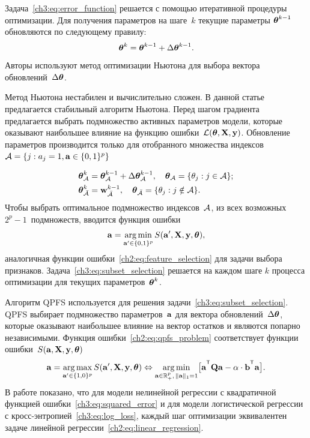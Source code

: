 Задача~\eqref{ch3:eq:error_function} решается с помощью итеративной процедуры оптимизации. 
Для получения параметров на шаге~$k$ текущие параметры $\boldsymbol{\theta}^{k-1}$ обновляются по следующему правилу:
\begin{equation}
\boldsymbol{\theta}^k = \boldsymbol{\theta}^{k - 1} + \Delta \boldsymbol{\theta}^{k - 1}.
\label{ch3:eq:update_rule}
\end{equation}
Авторы используют метод оптимизации Ньютона для выбора вектора обновлений~$\Delta \boldsymbol{\theta}$.

Метод Ньютона нестабилен и вычислительно сложен. 
В данной статье предлагается стабильный алгоритм Ньютона. 
Перед шагом градиента предлагается выбрать подмножество активных параметров модели, которые оказывают наибольшее влияние на функцию ошибки~$\mathcal{L} (\boldsymbol{\theta}, \mathbf{X}, \mathbf{y})$.
Обновление параметров производится только для отобранного множества индексов~$\mathcal{A} = \{j: a_j = 1, \mathbf{a} \in \{0, 1\}^p\}$

\begin{align*}
\boldsymbol{\theta}_{\mathcal{A}}^k &= \boldsymbol{\theta}_{\mathcal{A}}^{k - 1} + \Delta \boldsymbol{\theta}_{\mathcal{A}}^{k - 1}, \quad \boldsymbol{\theta}_{\mathcal{A}} = \{\theta_j: j \in \mathcal{A} \}; \\
\boldsymbol{\theta}_{\bar{\mathcal{A}}}^k &= \mathbf{w}_{\bar{\mathcal{A}}}^{k - 1}, \quad \boldsymbol{\theta}_{\bar{\mathcal{A}}} = \{\theta_j: j \notin \mathcal{A} \}.
\end{align*}
Чтобы выбрать оптимальное подмножество индексов~$\mathcal{A}$, из всех возможных $2^p - 1$~подмножеств, вводится функция ошибки
\begin{equation}
\mathbf{a} = \mathop{\arg \min}\limits_{\mathbf{a}' \in \{0, 1\}^p} S(\mathbf{a}', \mathbf{X}, \mathbf{y}, \boldsymbol{\theta}),
\label{ch3:eq:subset_selection}
\end{equation}
аналогичная функции ошибки~\eqref{ch2:eq:feature_selection} для задачи выбора признаков. 
Задача~\eqref{ch3:eq:subset_selection} решается на каждом шаге $k$ процесса оптимизации для текущих параметров~$\boldsymbol{\theta}^k$.

Алгоритм QPFS используется для решения задачи~\eqref{ch3:eq:subset_selection}.
QPFS выбирает подмножество параметров~$\mathbf{a}$ для вектора обновлений~$ \Delta \boldsymbol{\theta}$, которые оказывают наибольшее влияние на вектор остатков и являются попарно независимыми.
Функция ошибки~\eqref{ch2:eq:qpfs_problem} соответствует функции ошибки~$S(\mathbf{a}, \mathbf{X}, \mathbf{y}, \boldsymbol{\theta})$
\begin{equation}
\ba = \argmax_{\ba' \in \{1, 0\}^p} S(\ba', \bX, \by, \btheta) \Leftrightarrow \argmin_{\ba  \in \bbR^p_+, \, \|\ba\|_1=1} \bigl[\ba^{\T} \bQ \ba - \alpha \cdot \mathbf{b}^{\T} \ba \bigr].
\end{equation}
В работе показано, что для модели нелинейной регрессии с квадратичной функцией ошибки~\eqref{ch3:eq:squared_error} и для модели логистической регрессии с кросс-энтропией~\eqref{ch3:eq:log_loss}, каждый шаг оптимизации эквивалентен задаче линейной регрессии~\eqref{ch2:eq:linear_regression}.



